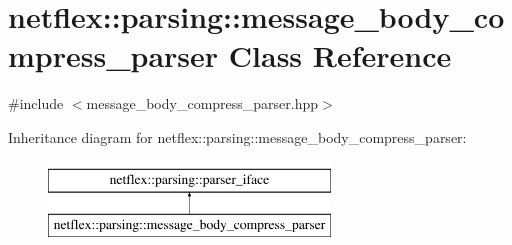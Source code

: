 \hypertarget{classnetflex_1_1parsing_1_1message__body__compress__parser}{}\section{netflex\+:\+:parsing\+:\+:message\+\_\+body\+\_\+compress\+\_\+parser Class Reference}
\label{classnetflex_1_1parsing_1_1message__body__compress__parser}


{\ttfamily \#include $<$message\+\_\+body\+\_\+compress\+\_\+parser.\+hpp$>$}

Inheritance diagram for netflex\+:\+:parsing\+:\+:message\+\_\+body\+\_\+compress\+\_\+parser\+:\begin{figure}[H]
\begin{center}
\leavevmode
\includegraphics[height=2.000000cm]{classnetflex_1_1parsing_1_1message__body__compress__parser}
\end{center}
\end{figure}
